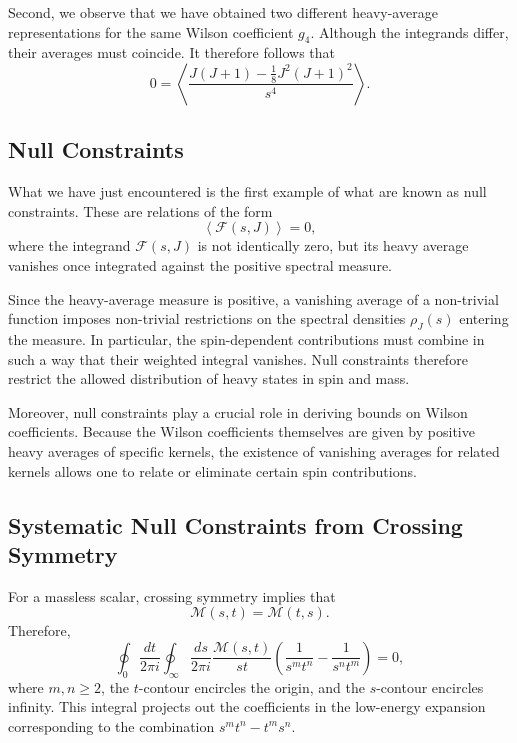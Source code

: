 Second, we observe that we have obtained two different heavy-average representations for the same Wilson coefficient $g_4$. Although the integrands differ, their averages must coincide. It therefore follows that
\begin{equation}
0 = \left\langle
\frac{J(J+1)-\tfrac{1}{8}J^2 (J+1)^2}{s^4}
\right\rangle .
\end{equation}

\subsection{Null Constraints}

What we have just encountered is the first example of what are known as 
null constraints. These are relations of the form
\begin{equation}
    \left\langle \mathcal{F}(s,J) \right\rangle = 0,
\end{equation}
where the integrand $\mathcal{F}(s,J)$ is not identically zero, but its heavy 
average vanishes once integrated against the positive spectral measure.


Since the heavy-average measure is positive, a vanishing average of a 
non-trivial function imposes non-trivial restrictions on the spectral densities 
$\rho_J(s)$ entering the measure. In particular, the spin-dependent 
contributions must combine in such a way that their weighted integral vanishes. 
Null constraints therefore restrict the allowed distribution of heavy states in 
spin and mass.

Moreover, null constraints play a crucial role in deriving bounds on Wilson coefficients. Because the Wilson coefficients themselves are given by positive 
heavy averages of specific kernels, the existence of vanishing averages for 
related kernels allows one to relate or eliminate certain spin contributions. 

\subsection{Systematic Null Constraints from Crossing Symmetry}
For a massless scalar, crossing symmetry implies that
\begin{equation}
\mathcal{M}(s,t) = \mathcal{M}(t,s).
\end{equation}
Therefore,
\begin{equation}
\oint_0 \frac{dt}{2 \pi i} \oint_\infty \frac{ds}{2 \pi i}
\frac{\mathcal{M}(s, t)}{st} \left(
\frac{1}{s^m t^n} - \frac{1}{s^n t^m}
\right) = 0,
\label{eq:hihgenint}
\end{equation}
where $m, n \geq2$, the $t$-contour encircles the origin, and the $s$-contour encircles infinity. This integral projects out the coefficients in the low-energy expansion corresponding to the combination $s^m t^n - t^m s^n$.

